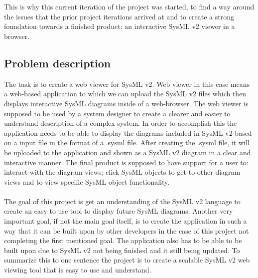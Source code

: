 \documentclass{article}
\begin{document}
\\ \\
This is why this current iteration of the project was started, to find a way around the issues that the prior project iterations arrived at and to create a strong foundation towards a finished product; an interactive SysML v2 viewer in a browser.

\subsection{Problem description}
The task is to create a web viewer for SysML v2. Web viewer in this case means a web-based application to which we can upload the SysML v2 files which then displays interactive SysML diagrams inside of a web-browser. The web viewer is supposed to be used by a system designer to create a clearer and easier to understand description of a complex system. In order to accomplish this the application needs to be able to display the diagrams included in SysML v2 based on a input file in the format of a .sysml file. After creating the .sysml file, it will be uploaded to the application and shown as a SysML v2 diagram in a clear and interactive manner. The final product is supposed to have support for a user to: interact with the diagram views; click SysML objects to get to other diagram views and to view specific SysML object functionality.
\\\\
The goal of this project is get an understanding of the SysML v2 language to create an easy to use tool to display future SysML diagrams. Another very important goal, if not the main goal itself, is to create the application in such a way that it can be built upon by other developers in the case of this project not completing the first mentioned goal. The application also has to be able to be built upon due to SysML v2 not being finished and it still being updated. To summarize this to one sentence the project is to create a scalable SysML v2 web viewing tool that is easy to use and understand.
\end{document}
